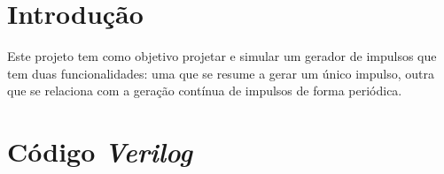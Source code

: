 \documentclass[10pt]{article}
\begin{document}

\pagebreak

\renewcommand{\contentsname}{Índice}
\tableofcontents
\pagebreak

\section{Introdução}

Este projeto tem como objetivo projetar e simular um gerador de impulsos que tem duas funcionalidades: uma que se resume a gerar um único impulso, outra que se relaciona com a geração contínua de impulsos de forma periódica.

\section{Código \textit{Verilog}}
\end{document}
